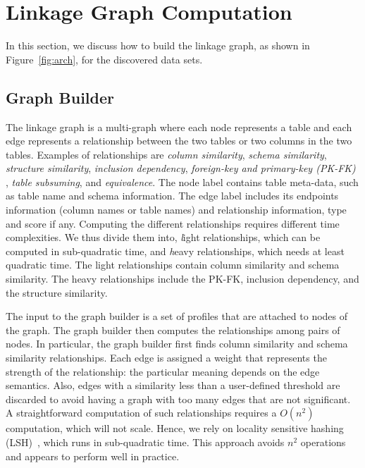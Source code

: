 \section{Linkage Graph Computation}
\label{sec:stitching}
In this section, we
discuss how to build the linkage graph, as shown in Figure~\ref{fig:arch}, for the discovered data sets.



\subsection{Graph Builder}
\label{subsec:graphbuild}

The linkage graph is a multi-graph where each node represents a table and each
edge represents a relationship between the two tables or two columns in the two tables. 
Examples of relationships are 
\emph{column similarity}, 
\emph{schema similarity}, 
\emph{structure similarity}, %
\emph{inclusion dependency}, 
\emph{foreign-key and primary-key (PK-FK)} , 
\emph{table subsuming}, and 
\emph{equivalence}. 
The node label contains table meta-data, such as table name and schema information. 
The edge label includes its endpoints information (column names or table names) and
relationship information, \eg type and score if any. 
Computing the different relationships requires different time complexities.
We thus divide them into, {\textit light relationships}, which can be computed in sub-quadratic time,
and {\textit heavy relationships}, which needs at least quadratic time. 
The light relationships contain column similarity and schema similarity. 
The heavy relationships include the PK-FK, inclusion dependency, and the structure similarity. 


The input to the graph builder is a set of profiles that are attached to nodes of the graph. 
The graph builder then computes the relationships  among pairs of nodes. 
In particular, the graph builder first finds column similarity and schema similarity relationships. 
Each edge is assigned a weight that represents the strength of the relationship: the particular meaning depends on the edge semantics.  
Also, edges with a similarity less than a user-defined threshold are discarded to avoid having a graph with too many edges that are not significant. 
A straightforward computation of such relationships requires a $O(n^2)$ computation, which will not scale.  
Hence, we rely on locality sensitive hashing (LSH)~\cite{DBLP:conf/compgeom/DatarIIM04}, which runs in sub-quadratic time. This approach avoids $n^2$ operations and appears to perform well in practice.


